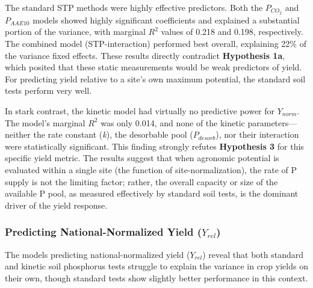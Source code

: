 \documentclass[
  a4paper,
]{article}
\begin{document}
The standard STP methods were highly effective predictors. Both the
\(P_{CO_2}\) and \(P_{AAE10}\) models showed highly significant
coefficients and explained a substantial portion of the variance, with
marginal \(R^2\) values of 0.218 and 0.198, respectively. The combined
model (STP-interaction) performed best overall, explaining 22\% of the
variance fixed effects. These results directly contradict
\textbf{Hypothesis 1a}, which posited that these static measurements
would be weak predictors of yield. For predicting yield relative to a
site's own maximum potential, the standard soil tests perform very well.

In stark contrast, the kinetic model had virtually no predictive power
for \(Y_{norm}\). The model's marginal \(R^2\) was only 0.014, and none
of the kinetic parameters---neither the rate constant (\emph{k}), the
desorbable pool (\(P_{desorb}\)), nor their interaction were
statistically significant. This finding strongly refutes
\textbf{Hypothesis 3} for this specific yield metric. The results
suggest that when agronomic potential is evaluated within a single site
(the function of site-normalization), the rate of P supply is not the
limiting factor; rather, the overall capacity or size of the available P
pool, as measured effectively by standard soil tests, is the dominant
driver of the yield response.

\subsubsection{\texorpdfstring{Predicting National-Normalized Yield
(\(Y_{rel}\))}{Predicting National-Normalized Yield (Y\_\{rel\})}}\label{predicting-national-normalized-yield-y_rel}

The models predicting national-normalized yield (\(Y_{rel}\)) reveal
that both standard and kinetic soil phosphorus tests struggle to explain
the variance in crop yields on their own, though standard tests show
slightly better performance in this context.
\end{document}
